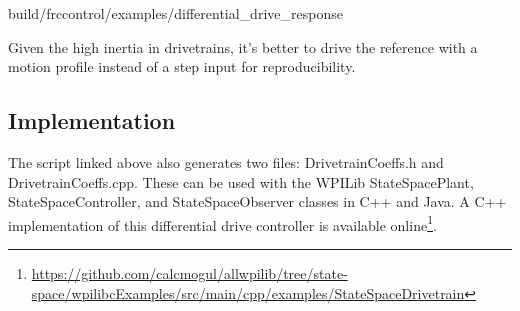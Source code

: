 \begin{svg}{build/frccontrol/examples/differential_drive_response}
  \caption{Drivetrain response}
  \label{fig:diff_drive_response}
\end{svg}

Given the high inertia in drivetrains, it's better to drive the \gls{reference}
with a motion profile instead of a \gls{step input} for reproducibility.

\subsection{Implementation}

The script linked above also generates two files: DrivetrainCoeffs.h and
DrivetrainCoeffs.cpp. These can be used with the WPILib StateSpacePlant,
StateSpaceController, and StateSpaceObserver classes in C++ and Java. A C++
implementation of this differential drive controller is available
online\footnote{
\url{https://github.com/calcmogul/allwpilib/tree/state-space/wpilibcExamples/src/main/cpp/examples/StateSpaceDrivetrain}}.
